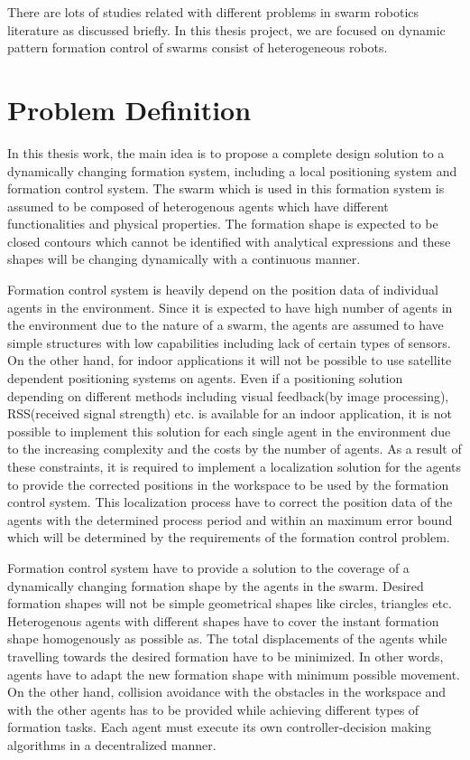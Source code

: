 There are lots of studies related with different problems in swarm robotics literature as discussed briefly. In this thesis project, we are focused on dynamic pattern formation control of swarms consist of heterogeneous robots.

\section{Problem Definition}
In this thesis work, the main idea is to propose a complete design solution to a dynamically changing formation system, including a local positioning system and formation control system. The swarm which is used in this formation system is assumed to be composed of heterogenous agents which have different functionalities and physical properties. The formation shape is expected to be closed contours which cannot be identified with analytical expressions and these shapes will be changing dynamically with a continuous manner. 

Formation control system is heavily depend on the position data of individual agents in the environment. Since it is expected to have high number of agents in the environment due to the nature of a swarm, the agents are assumed to have simple structures with low capabilities including lack of certain types of sensors. On the other hand, for indoor applications it will not be possible to use satellite dependent positioning systems on agents. Even if a positioning solution depending on different methods including visual feedback(by image processing), RSS(received signal strength) etc. is available for an indoor application, it is not possible to implement this solution for each single agent in the environment due to the increasing complexity and the costs by the number of agents. As a result of these constraints, it is required to implement a localization solution for the agents to provide the corrected positions in the workspace to be used by the formation control system. This localization process have to correct the position data of the agents with the determined process period and within an maximum error bound which will be determined by the requirements of the formation control problem. 

Formation control system have to provide a solution to the coverage of a dynamically changing formation shape by the agents in the swarm. Desired formation shapes will not be simple geometrical shapes like circles, triangles etc.  Heterogenous agents with different shapes have to cover the instant formation shape homogenously as possible as. The total displacements of the agents while travelling towards the desired formation have to be minimized. In other words, agents have to adapt the new formation shape with minimum possible movement. On the other hand, collision avoidance with the obstacles in the workspace and with the other agents has to be provided while achieving different types of formation tasks. Each agent must execute its own controller-decision making algorithms in a decentralized manner. 

